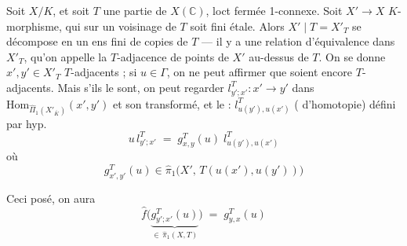\documentclass[11pt,a4paper]{article}
\begin{document}
Soit $X/K$, et soit $T$ une partie de  $X(\mathbb{C})$, loct fermée 1-connexe. Soit $X' \to X$   $K$-morphisme, qui sur  un voisinage de $T$ soit fini étale. Alors $X' \mid T = X'_T$ se décompose en un ens fini de copies de $T$ --- il y a une relation d'équivalence dans $X'_T$, qu'on appelle la $T$-adjacence de points de $X'$ au-dessus de $T$. On se donne  $x', y' \in X'_T$ $T$-adjacents ;
si $u \in \Gamma$, on ne peut affirmer que \struck{\ill{}}  soient encore $T$-adjacents. Mais s'ils le sont, on peut regarder  $l^{T}_{y';x'} : x' \to y'$ dans  $\mathrm{Hom}_{\hat\Pi_1(X'_{\bar K})}(x', y')$ et son transformé, \struck{\ill{}}
 et le  : $l^{T}_{u(y'),u(x')}$  ( d'homotopie) défini par hyp.
\begin{equation*}
  \tag{53} u\, l^{T}_{y';x'} \;=\; g^{T}_{x,y}(u)\; l^{T}_{u(y'),u(x')}
\end{equation*}
où
\[
  g^{T}_{x',y'}(u) \in \hat\pi_1\bigl(X',\, T(u(x'),u(y'))\bigr)
\]

Ceci posé, on aura
\begin{equation*}
  \tag{54} \hat f\bigl(\underbrace{g^{T}_{y';x'}(u)}_{\in\, \hat\pi_1(X,T)}\bigr) \;=\; g^{T}_{y,x}(u)
\end{equation*}
\end{document}
